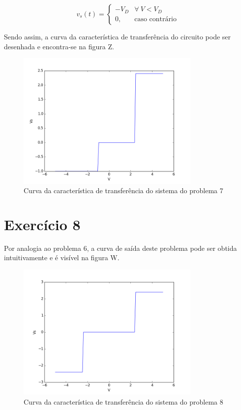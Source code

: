 \documentclass[12pt, a4paper, twoside]{article}
\begin{document}

\begin{equation}
    v_s(t) =
    \begin{cases}
        -V_D & \forall\ V < V_D \\
        0, & \text{caso contrário}
    \end{cases}
\end{equation}

Sendo assim, a curva da característica de transferência do circuito pode ser desenhada
e encontra-se na figura Z.
\begin{figure}
    \centering
    \includegraphics[width=0.8\textwidth]{figs/rel3/ex7.png}
    \caption{Curva da característica de transferência do sistema do problema 7}
\end{figure}

\section{Exercício 8}

Por analogia ao problema 6, a curva de saída deste problema pode ser obtida
intuitivamente e é visível na figura W.

\begin{figure}
    \centering
    \includegraphics[width=0.8\textwidth]{figs/rel3/ex8.png}
    \caption{Curva da característica de transferência do sistema do problema 8}
\end{figure}
\end{document}

